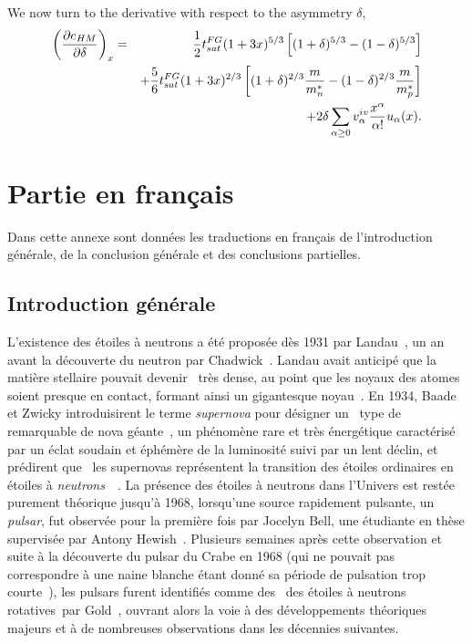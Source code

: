 %
We now turn to the derivative with respect to the asymmetry $\delta$,
%
\begin{eqnarray}
  \left(\frac{\partial e_{HM}}{\partial \delta}\right)_x &=&
  \frac{1}{2}t_{sat}^{FG}(1+3x)^{5/3}\left[(1+\delta)^{5/3} 
  - (1-\delta)^{5/3}\right]\notag\\
                                                         &&+ 
  \frac{5}{6}t_{sat}^{FG}(1+3x)^{2/3}\left[(1+\delta)^{2/3}\frac{m}{m_n^*} -
  (1-\delta)^{2/3}\frac{m}{m_p^*}\right]\notag\\
                                                         &&+
  2\delta \sum_{\alpha \geq 0}v_\alpha^{iv}\frac{x^\alpha}{\alpha!}u_\alpha(x).
\end{eqnarray}
%

\chapter{Partie en français}\label{appendix:fr_part}

Dans cette annexe sont données les traductions en français de l'introduction 
générale, de la conclusion générale et des conclusions partielles.

\section{Introduction générale}

L'existence des étoiles à neutrons a été proposée dès 1931 par
Landau~\cite{Landau1932}, un an avant la découverte du neutron par
Chadwick~\cite{Chadwick1932}. Landau avait anticipé que la matière stellaire
pouvait devenir \guillemotleft~très dense, au point que les noyaux des atomes 
soient presque en contact, formant ainsi un gigantesque noyau~\guillemotright.
En 1934, Baade et Zwicky introduisirent le terme \textit{supernova} pour
désigner un \guillemotleft~type de remarquable de nova géante~\guillemotright,
un phénomène rare et très énergétique caractérisé par un éclat soudain 
et éphémère de la luminosité suivi par un lent déclin, et prédirent que
\guillemotleft~les supernovas représentent la transition des étoiles ordinaires 
en étoiles à \textit{neutrons}~\guillemotright~\cite{Baade1934}.
La présence des étoiles à neutrons dans l'Univers est restée purement théorique
jusqu'à 1968, lorsqu'une source rapidement pulsante, un \textit{pulsar}, fut
observée pour la première fois par Jocelyn Bell, une étudiante en thèse 
supervisée par Antony Hewish~\cite{Hewish1968}. Plusieurs semaines après cette
observation et suite à la découverte du pulsar du Crabe en 1968 (qui ne 
pouvait pas correspondre à une naine blanche étant donné sa période de
pulsation trop courte~\cite{Comella1969}), les pulsars furent identifiés comme
des \guillemotleft~des étoiles à neutrons rotatives~\guillemotright par
Gold~\cite{Gold1968}, ouvrant alors la voie à des développements théoriques 
majeurs et à de nombreuses observations dans les décennies suivantes.
\\

